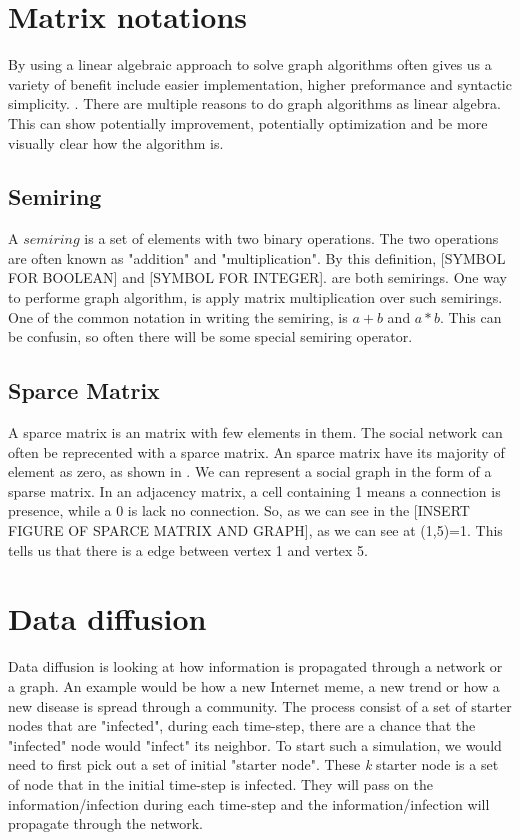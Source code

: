 \section{Matrix notations}
By using a linear algebraic approach to solve graph algorithms often gives us a variety of benefit include easier implementation, higher preformance and syntactic simplicity. \cite{MathToAlgo}. There are multiple reasons to do graph algorithms as linear algebra. This can show potentially improvement, potentially optimization and be more visually clear how the algorithm is. 



\subsection{Semiring}
A $semiring$ is a set of elements with two binary operations. The two operations are often known as "addition" and "multiplication". By this definition, [SYMBOL FOR BOOLEAN] and [SYMBOL FOR INTEGER]. are both semirings.  One way to performe graph algorithm, is apply matrix multiplication over such semirings. One of the common notation in writing the semiring, is $a+b$ and $a \ast b$. This can be confusin, so often there will be some special semiring operator.

\subsection{Sparce Matrix}
A sparce matrix is an matrix with few elements in them. The social network can often be reprecented with a sparce matrix. An sparce matrix have its majority of element as zero, as shown in . We can represent a social graph in the form of a sparse matrix. In an adjacency matrix, a cell containing 1 means a connection is presence, while a 0 is lack no connection. So, as we can see in the [INSERT FIGURE OF SPARCE MATRIX AND GRAPH], as we can see at (1,5)=1. This tells us that there is a edge between vertex 1 and vertex 5.



\section{Data diffusion}
Data diffusion is looking at how information is propagated through a network or a graph. An example would be how a new Internet meme, a new trend or how a new disease is spread through a community. The process consist of a set of starter nodes that are "infected", during each time-step, there are a chance that the "infected" node would "infect" its neighbor. To start such a simulation, we would need to first pick out a set of initial "starter node". These {\it k} starter node is a set of node that in the initial time-step is infected. They will pass on the information/infection during each time-step and the information/infection will propagate through the network.

